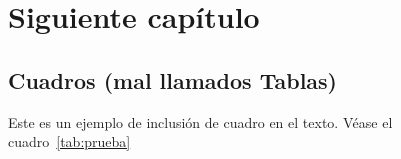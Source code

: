 
\chapter{Siguiente capítulo}


\section{Cuadros (mal llamados Tablas)}

Este es un ejemplo de inclusi\'on de cuadro en el texto. V\'ease el cuadro~\ref{tab:prueba}

